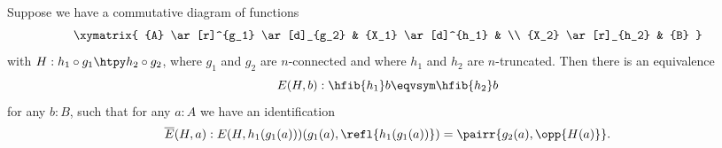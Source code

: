 %
\begin{lem}\label{prop:factor_equiv_fiber}
Suppose we have a commutative diagram of functions
\begin{equation*}
  \xymatrix{
    {A} \ar[r]^{g_1} \ar[d]_{g_2} &
    {X_1} \ar[d]^{h_1} &
    \\
    {X_2} \ar[r]_{h_2}
    &
    {B}
  }
\end{equation*}
with $H:h_1\circ g_1\htpy h_2\circ g_2$, where $g_1$ and $g_2$ are $n$-connected and where $h_1$ and $h_2$ are $n$-truncated.
Then there is an equivalence
\begin{equation*}
E(H,b):\hfib{h_1}b\eqvsym\hfib{h_2}b
\end{equation*}
for any $b:B$, such that for any $a:A$ we have an identification
\[\overline{E}(H,a) :  E(H,h_1(g_1(a)))({g_1(a),\refl{h_1(g_1(a))}}) = \pairr{g_2(a),\opp{H(a)}}.\]
\end{lem}

